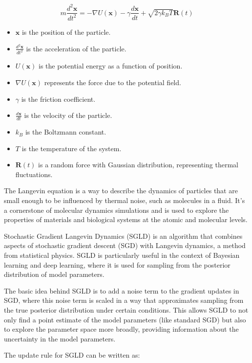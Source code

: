 \documentclass{article}
\begin{document}
\[ m \frac{d^2\mathbf{x}}{dt^2} = -\nabla U(\mathbf{x}) - \gamma \frac{d\mathbf{x}}{dt} + \sqrt{2\gamma k_B T} \mathbf{R}(t) \]

\begin{itemize}
    \item \( \mathbf{x} \) is the position of the particle.
    \item \( \frac{d^2\mathbf{x}}{dt^2} \) is the acceleration of the particle.
    \item \( U(\mathbf{x}) \) is the potential energy as a function of position.
    \item \( \nabla U(\mathbf{x}) \) represents the force due to the potential field.
    \item \( \gamma \) is the friction coefficient.
    \item \( \frac{d\mathbf{x}}{dt} \) is the velocity of the particle.
    \item \( k_B \) is the Boltzmann constant.
    \item \( T \) is the temperature of the system.
    \item \( \mathbf{R}(t) \) is a random force with Gaussian distribution, representing thermal fluctuations.
\end{itemize}

The Langevin equation is a way to describe the dynamics of particles that are small enough to be influenced by thermal noise, such as molecules in a fluid. It's a cornerstone of molecular dynamics simulations and is used to explore the properties of materials and biological systems at the atomic and molecular levels.

Stochastic Gradient Langevin Dynamics (SGLD) is an algorithm that combines aspects of stochastic gradient descent (SGD) with Langevin dynamics, a method from statistical physics. SGLD is particularly useful in the context of Bayesian learning and deep learning, where it is used for sampling from the posterior distribution of model parameters.

The basic idea behind SGLD is to add a noise term to the gradient updates in SGD, where this noise term is scaled in a way that approximates sampling from the true posterior distribution under certain conditions. This allows SGLD to not only find a point estimate of the model parameters (like standard SGD) but also to explore the parameter space more broadly, providing information about the uncertainty in the model parameters.

The update rule for SGLD can be written as:
\end{document}
